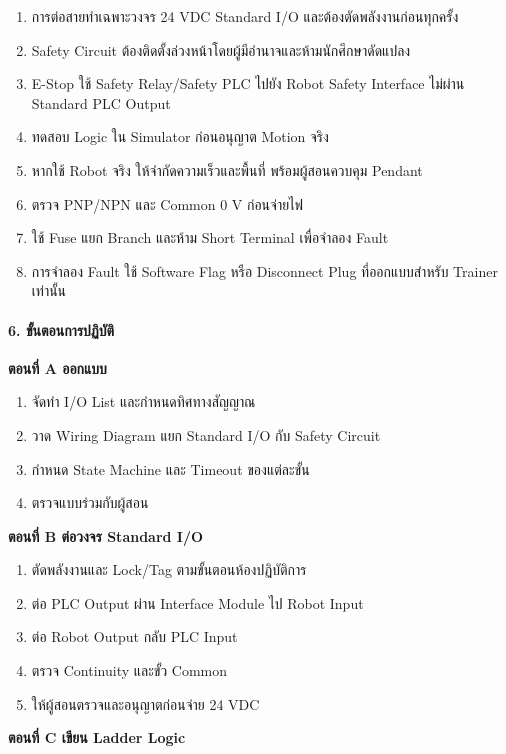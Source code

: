 \begin{enumerate}
    \item การต่อสายทำเฉพาะวงจร 24 VDC Standard I/O และต้องตัดพลังงานก่อนทุกครั้ง
    \item Safety Circuit ต้องติดตั้งล่วงหน้าโดยผู้มีอำนาจและห้ามนักศึกษาดัดแปลง
    \item E-Stop ใช้ Safety Relay/Safety PLC ไปยัง Robot Safety Interface ไม่ผ่าน Standard PLC Output
    \item ทดสอบ Logic ใน Simulator ก่อนอนุญาต Motion จริง
    \item หากใช้ Robot จริง ให้จำกัดความเร็วและพื้นที่ พร้อมผู้สอนควบคุม Pendant
    \item ตรวจ PNP/NPN และ Common 0 V ก่อนจ่ายไฟ
    \item ใช้ Fuse แยก Branch และห้าม Short Terminal เพื่อจำลอง Fault
    \item การจำลอง Fault ใช้ Software Flag หรือ Disconnect Plug ที่ออกแบบสำหรับ Trainer เท่านั้น
\end{enumerate}

\paragraph{6. ขั้นตอนการปฏิบัติ}

\textbf{ตอนที่ A ออกแบบ}

\begin{enumerate}
    \item จัดทำ I/O List และกำหนดทิศทางสัญญาณ
    \item วาด Wiring Diagram แยก Standard I/O กับ Safety Circuit
    \item กำหนด State Machine และ Timeout ของแต่ละขั้น
    \item ตรวจแบบร่วมกับผู้สอน
\end{enumerate}

\textbf{ตอนที่ B ต่อวงจร Standard I/O}

\begin{enumerate}
    \item ตัดพลังงานและ Lock/Tag ตามขั้นตอนห้องปฏิบัติการ
    \item ต่อ PLC Output ผ่าน Interface Module ไป Robot Input
    \item ต่อ Robot Output กลับ PLC Input
    \item ตรวจ Continuity และขั้ว Common
    \item ให้ผู้สอนตรวจและอนุญาตก่อนจ่าย 24 VDC
\end{enumerate}

\textbf{ตอนที่ C เขียน Ladder Logic}

